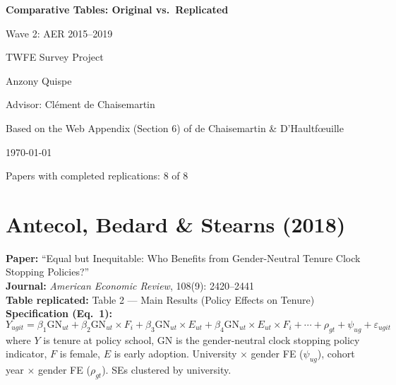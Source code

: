 \documentclass[11pt,a4paper]{article}
\begin{document}
\begin{titlepage}
\centering
\vspace*{3cm}
{\Huge\bfseries Comparative Tables: Original vs.\ Replicated\par}
\vspace{1cm}
{\LARGE Wave 2: AER 2015--2019\par}
\vspace{2cm}
{\Large TWFE Survey Project\par}
\vspace{0.5cm}
{\large Anzony Quispe\par}
{\large Advisor: Cl\'ement de Chaisemartin\par}
\vspace{1cm}
{\large Based on the Web Appendix (Section 6) of de Chaisemartin \& D'Haultf\oe uille\par}
\vspace{2cm}
{\large \today\par}
\vfill
{\small Papers with completed replications: 8 of 8\par}
\end{titlepage}

\tableofcontents
\newpage

\section{Antecol, Bedard \& Stearns (2018)}

\textbf{Paper:} ``Equal but Inequitable: Who Benefits from Gender-Neutral Tenure Clock Stopping Policies?''\\
\textbf{Journal:} \textit{American Economic Review}, 108(9): 2420--2441\\
\textbf{Table replicated:} Table 2 --- Main Results (Policy Effects on Tenure)\\
\textbf{Specification (Eq.\ 1):}
\[
Y_{ugit} = \beta_1 \text{GN}_{ut} + \beta_2 \text{GN}_{ut} \times F_i + \beta_3 \text{GN}_{ut} \times E_{ut}
+ \beta_4 \text{GN}_{ut} \times E_{ut} \times F_i + \cdots + \rho_{gt} + \psi_{ug} + \varepsilon_{ugit}
\]
where $Y$ is tenure at policy school, GN is the gender-neutral clock stopping policy indicator, $F$ is female, $E$ is early adoption. University $\times$ gender FE ($\psi_{ug}$), cohort year $\times$ gender FE ($\rho_{gt}$). SEs clustered by university.
\end{document}

